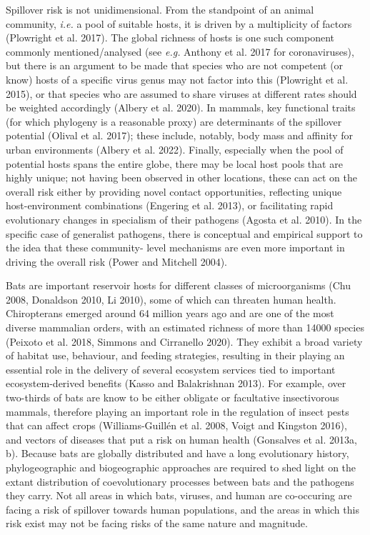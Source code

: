 \documentclass[11pt]{article}
\begin{document}
Spillover risk is not unidimensional. From the standpoint of an animal
community, \emph{i.e.} a pool of suitable hosts, it is driven by a
multiplicity of factors (Plowright et al. 2017). The global richness of
hosts is one such component commonly mentioned/analysed (see \emph{e.g.}
Anthony et al. 2017 for coronaviruses), but there is an argument to be
made that species who are not competent (or know) hosts of a specific
virus genus may not factor into this (Plowright et al. 2015), or that
species who are assumed to share viruses at different rates should be
weighted accordingly (Albery et al. 2020). In mammals, key functional
traits (for which phylogeny is a reasonable proxy) are determinants of
the spillover potential (Olival et al. 2017); these include, notably,
body mass and affinity for urban environments (Albery et al. 2022).
Finally, especially when the pool of potential hosts spans the entire
globe, there may be local host pools that are highly unique; not having
been observed in other locations, these can act on the overall risk
either by providing novel contact opportunities, reflecting unique
host-environment combinations (Engering et al. 2013), or facilitating
rapid evolutionary changes in specialism of their pathogens (Agosta et
al. 2010). In the specific case of generalist pathogens, there is
conceptual and empirical support to the idea that these community- level
mechanisms are even more important in driving the overall risk (Power
and Mitchell 2004).

Bats are important reservoir hosts for different classes of
microorganisms (Chu 2008, Donaldson 2010, Li 2010), some of which can
threaten human health. Chiropterans emerged around 64 million years ago
and are one of the most diverse mammalian orders, with an estimated
richness of more than 14000 species (Peixoto et al. 2018, Simmons and
Cirranello 2020). They exhibit a broad variety of habitat use,
behaviour, and feeding strategies, resulting in their playing an
essential role in the delivery of several ecosystem services tied to
important ecosystem-derived benefits (Kasso and Balakrishnan 2013). For
example, over two-thirds of bats are know to be either obligate or
facultative insectivorous mammals, therefore playing an important role
in the regulation of insect pests that can affect crops
(Williams-Guillén et al. 2008, Voigt and Kingston 2016), and vectors of
diseases that put a risk on human health (Gonsalves et al. 2013a, b).
Because bats are globally distributed and have a long evolutionary
history, phylogeographic and biogeographic approaches are required to
shed light on the extant distribution of coevolutionary processes
between bats and the pathogens they carry. Not all areas in which bats,
viruses, and human are co-occuring are facing a risk of spillover
towards human populations, and the areas in which this risk exist may
not be facing risks of the same nature and magnitude.
\end{document}

